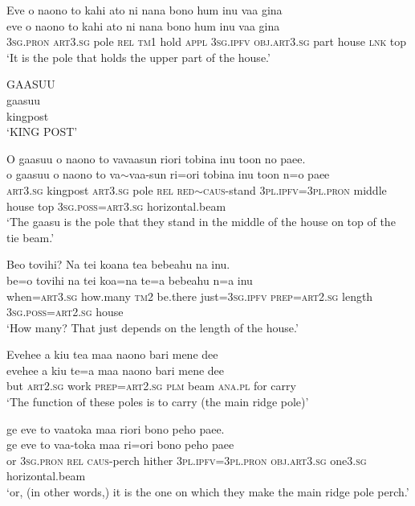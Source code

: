 \ea\label{ex:text11-18}
Eve o naono to kahi ato ni nana bono hum inu vaa gina\\
\gll eve	o	naono	to	kahi	ato	ni	nana	bono	hum	inu	vaa	gina\\
     3\textsc{sg}.\textsc{pron}	\textsc{art}3.\textsc{sg}	pole	\textsc{rel}	\textsc{tm}1	hold	\textsc{appl}	3\textsc{sg}.\textsc{ipfv}	\textsc{obj}.\textsc{art}3.\textsc{sg}	part	house	\textsc{lnk}	top\\
\glt `It is the pole that holds the upper part of the house.'
\z

\ea\label{ex:text11-19}
GAASUU\\
\gll gaasuu\\
     kingpost\\
\glt `KING POST'
\z

\ea\label{ex:text11-20}
O gaasuu o naono to vavaasun riori tobina inu toon no paee.\\
\gll o	gaasuu	o	naono	to	va{$\sim$}vaa-sun	ri=ori	tobina	inu	toon	n=o	paee\\
     \textsc{art}3.\textsc{sg}	kingpost	\textsc{art}3.\textsc{sg}	pole	\textsc{rel}	\textsc{red}{$\sim$}\textsc{caus}-stand	3\textsc{pl}.\textsc{ipfv}=3\textsc{pl}.\textsc{pron}	middle	house	top	3\textsc{sg}.\textsc{poss}=\textsc{art}3.\textsc{sg}	horizontal.beam\\
\glt `The gaasu is the pole that they stand in the middle of the house on top of the tie beam.'
\z

\ea\label{ex:text11-21}
Beo tovihi? Na tei koana tea bebeahu na inu.\\
\gll be=o	tovihi	na	tei	koa=na	te=a	bebeahu	n=a	inu\\
     when=\textsc{art}3.\textsc{sg}	how.many	\textsc{tm}2	be.there	just=3\textsc{sg}.\textsc{ipfv}	\textsc{prep}=\textsc{art}2.\textsc{sg}	length	3\textsc{sg}.\textsc{poss}=\textsc{art}2.\textsc{sg}	house\\
\glt `How many? That just depends on the length of the house.'
\z

\ea\label{ex:text11-22}
Evehee a kiu tea maa naono bari mene dee\\
\gll evehee	a	kiu	te=a	maa	naono	bari	mene	dee\\
     but	\textsc{art}2.\textsc{sg}	work	\textsc{prep}=\textsc{art}2.\textsc{sg}	\textsc{plm}	beam	\textsc{ana}.\textsc{pl}	for	carry\\
\glt `The function of these poles is to carry (the main ridge pole)'
\z

\ea\label{ex:text11-23}
ge eve to vaatoka maa riori bono peho paee.\\
\gll ge	eve	to	vaa-toka	maa	ri=ori	bono	peho	paee\\
     or	3\textsc{sg}.\textsc{pron}	\textsc{rel}	\textsc{caus}-perch	hither	3\textsc{pl}.\textsc{ipfv}=3\textsc{pl}.\textsc{pron}	\textsc{obj}.\textsc{art}3.\textsc{sg}	one3.\textsc{sg}	horizontal.beam\\
\glt `or, (in other words,) it is the one on which they make the main ridge pole perch.'
\z

